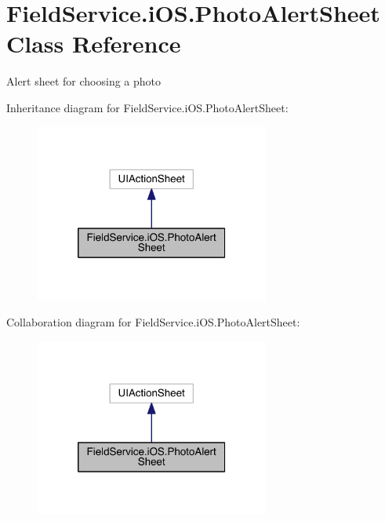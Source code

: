 \hypertarget{class_field_service_1_1i_o_s_1_1_photo_alert_sheet}{\section{Field\+Service.\+i\+O\+S.\+Photo\+Alert\+Sheet Class Reference}
\label{class_field_service_1_1i_o_s_1_1_photo_alert_sheet}
}


Alert sheet for choosing a photo  




Inheritance diagram for Field\+Service.\+i\+O\+S.\+Photo\+Alert\+Sheet\+:
\nopagebreak
\begin{figure}[H]
\begin{center}
\leavevmode
\includegraphics[width=218pt]{class_field_service_1_1i_o_s_1_1_photo_alert_sheet__inherit__graph}
\end{center}
\end{figure}


Collaboration diagram for Field\+Service.\+i\+O\+S.\+Photo\+Alert\+Sheet\+:
\nopagebreak
\begin{figure}[H]
\begin{center}
\leavevmode
\includegraphics[width=218pt]{class_field_service_1_1i_o_s_1_1_photo_alert_sheet__coll__graph}
\end{center}
\end{figure}
